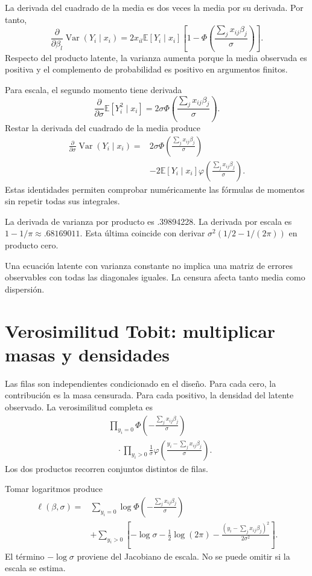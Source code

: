 \documentclass[11pt,a4paper]{article}
\newcommand{\E}{\mathbb E}
\DeclareMathOperator{\Var}{Var}
\begin{document}
La derivada del cuadrado de la
media es dos veces la media
por su derivada. Por tanto,
\[
\frac{\partial}{\partial\beta_l}\Var(Y_i\mid x_i)
=2x_{il}\E[Y_i\mid x_i]
\left[1-\Phi\left(\frac{\sum_jx_{ij}\beta_j}{\sigma}\right)\right].
\]
Respecto del producto latente,
la varianza aumenta porque
la media observada es positiva
y el complemento de probabilidad
es positivo en argumentos finitos.

Para escala, el segundo momento
tiene derivada
\[
\frac{\partial}{\partial\sigma}\E[Y_i^2\mid x_i]
=2\sigma\Phi\left(\frac{\sum_jx_{ij}\beta_j}{\sigma}\right).
\]
Restar la derivada del cuadrado
de la media produce
\[
\begin{aligned}
\frac{\partial}{\partial\sigma}\Var(Y_i\mid x_i)
={}&2\sigma\Phi\left(\frac{\sum_jx_{ij}\beta_j}{\sigma}\right)\\
&-2\E[Y_i\mid x_i]
\varphi\left(\frac{\sum_jx_{ij}\beta_j}{\sigma}\right).
\end{aligned}
\]
Estas identidades permiten
comprobar numéricamente las fórmulas
de momentos sin repetir
todas sus integrales.

\begin{ejemplo}
La derivada de varianza por producto
es .39894228.
La derivada por escala es
\(1-1/\pi\approx.68169011\).
Esta última coincide con derivar
\(\sigma^2(1/2-1/(2\pi))\)
en producto cero.
\end{ejemplo}
Una ecuación latente con varianza
constante no implica una
matriz de errores observables
con todas las diagonales iguales.
La censura afecta tanto
media como dispersión.

\clearpage
\section{Verosimilitud Tobit: multiplicar masas y densidades}\label{unidad92}
Las filas son independientes condicionado
en el diseño. Para cada cero,
la contribución es la masa censurada.
Para cada positivo, la densidad
del latente observado.
La verosimilitud completa es
\[
\begin{aligned}
&\prod_{y_i=0}
\Phi\left(-\frac{\sum_jx_{ij}\beta_j}{\sigma}\right)\\
&\quad\cdot\prod_{y_i>0}
\frac1\sigma
\varphi\left(\frac{y_i-\sum_jx_{ij}\beta_j}{\sigma}\right).
\end{aligned}
\]
Los dos productos recorren
conjuntos distintos de filas.

Tomar logaritmos produce
\[
\begin{aligned}
\ell(\beta,\sigma)
={}&\sum_{y_i=0}
\log\Phi\left(-\frac{\sum_jx_{ij}\beta_j}{\sigma}\right)\\
&+\sum_{y_i>0}\left[
-\log\sigma-\frac12\log(2\pi)
-\frac{(y_i-\sum_jx_{ij}\beta_j)^2}{2\sigma^2}
\right].
\end{aligned}
\]
El término \(-\log\sigma\)
proviene del Jacobiano de escala.
No se puede omitir si
la escala se estima.
\end{document}
